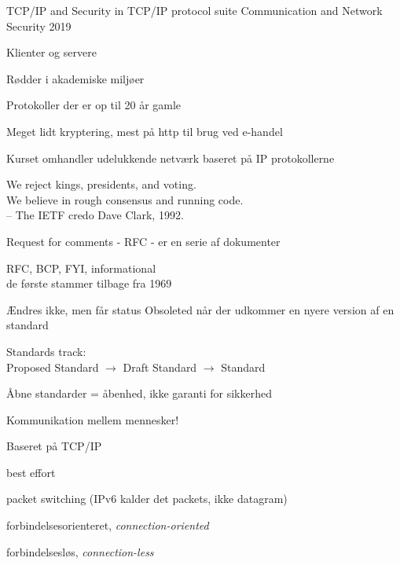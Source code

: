 \documentclass[Screen16to9,17pt,footrule]{foils}
\begin{document}
\mytitlepage
{TCP/IP and Security in TCP/IP protocol suite}
{Communication and Network Security 2019}







\vskip 2cm





\begin{list1}
\item Klienter og servere
\item Rødder i akademiske miljøer
\item Protokoller der er op til 20 år gamle
\item Meget lidt kryptering, mest på http til brug ved e-handel
\item Kurset omhandler udelukkende netværk baseret på IP protokollerne
\end{list1}


{\hlkbig \color{titlecolor}
We reject kings, presidents, and voting.\\
We believe in rough consensus and running code.\\
-- The IETF credo Dave Clark, 1992.}

\begin{list1}
\item Request for comments - RFC - er en serie af dokumenter
\item RFC, BCP, FYI, informational\\
de første stammer tilbage fra 1969
\item Ændres ikke, men får status Obsoleted når der udkommer en nyere
  version af en standard
\item Standards track:\\
Proposed Standard $\rightarrow$ Draft Standard $\rightarrow$ Standard
\item  Åbne standarder = åbenhed, ikke garanti for sikkerhed
\end{list1}



\begin{list1}
\item Kommunikation mellem mennesker!
\item Baseret på TCP/IP
\begin{list2}
\item best effort
\item packet switching (IPv6 kalder det packets, ikke datagram)
\item forbindelsesorienteret, \emph{connection-oriented}
\item forbindelsesløs, \emph{connection-less}
\end{list2}
\end{list1}
\end{document}
